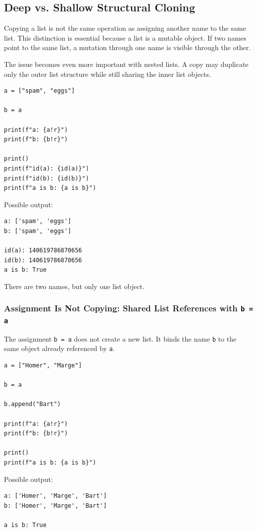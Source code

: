 \subsection{Deep vs. Shallow Structural Cloning}

Copying a list is not the same operation as assigning another name to the same list. This distinction is essential because a list is a mutable object. If two names point to the same list, a mutation through one name is visible through the other.

The issue becomes even more important with nested lists. A copy may duplicate only the outer list structure while still sharing the inner list objects.

\begin{verbatim}
a = ["spam", "eggs"]

b = a

print(f"a: {a!r}")
print(f"b: {b!r}")

print()
print(f"id(a): {id(a)}")
print(f"id(b): {id(b)}")
print(f"a is b: {a is b}")
\end{verbatim}

Possible output:

\begin{verbatim}
a: ['spam', 'eggs']
b: ['spam', 'eggs']

id(a): 140619786870656
id(b): 140619786870656
a is b: True
\end{verbatim}

There are two names, but only one list object.

\subsubsection{Assignment Is Not Copying: Shared List References with \texttt{b = a}}

The assignment \texttt{b = a} does not create a new list. It binds the name \texttt{b} to the same object already referenced by \texttt{a}.

\begin{verbatim}
a = ["Homer", "Marge"]

b = a

b.append("Bart")

print(f"a: {a!r}")
print(f"b: {b!r}")

print()
print(f"a is b: {a is b}")
\end{verbatim}

Possible output:

\begin{verbatim}
a: ['Homer', 'Marge', 'Bart']
b: ['Homer', 'Marge', 'Bart']

a is b: True
\end{verbatim}

